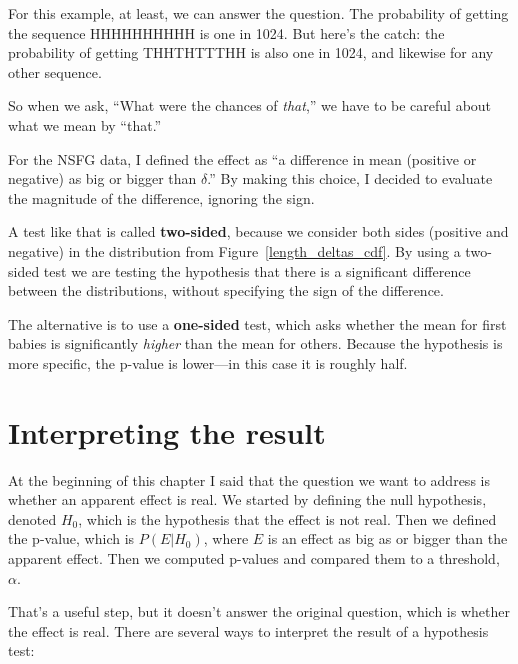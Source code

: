 \documentclass[12pt]{book}
\begin{document}
For this example, at least, we can answer the question.  The
probability of getting the sequence HHHHHHHHHH is one in 1024.  But
here's the catch: the probability of getting THHTHTTTHH is also one in
1024, and likewise for any other sequence.

So when we ask, ``What were the chances of {\em that},'' we have
to be careful about what we mean by ``that.''

For the NSFG data, I defined the effect as ``a difference in mean
(positive or negative) as big or bigger than $\delta$.''  By making
this choice, I decided to evaluate the magnitude of the difference,
ignoring the sign.

A test like that is called {\bf two-sided}, because we consider both
sides (positive and negative) in the distribution from
Figure~\ref{length_deltas_cdf}.  By using a two-sided test we are
testing the hypothesis that there is a significant difference between
the distributions, without specifying the sign of the difference.

The alternative is to use a {\bf one-sided} test, which asks whether
the mean for first babies is significantly {\em higher} than
the mean for others.  Because the hypothesis is more specific, the
p-value is lower---in this case it is roughly half.


\section{Interpreting the result}

At the beginning of this chapter I said that the question we want to
address is whether an apparent effect is real.  We started by defining
the null hypothesis, denoted $H_0$, which is the
hypothesis that the effect is not real.  Then we defined the p-value,
which is $P(E | H_0)$, where $E$ is an effect as big as or bigger than
the apparent effect.  Then we computed p-values and compared
them to a threshold, $\alpha$.

That's a useful step, but it doesn't answer the original question,
which is whether the effect is real.  There are several ways to
interpret the result of a hypothesis test:
\end{document}
